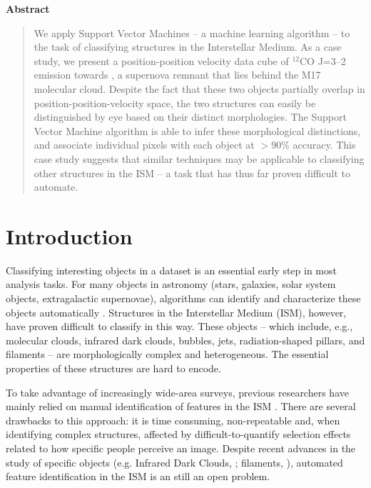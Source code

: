 
\begin{center}
  \bfseries Abstract
\end{center}
\begin{quote}
We apply Support Vector Machines -- a machine learning algorithm --  to the task of classifying structures in the Interstellar Medium. As a case study, we present a position-position velocity data cube of $^{12}$CO J=3--2 emission towards \snr{}, a supernova remnant that lies behind the M17 molecular cloud. Despite the fact that these two objects partially overlap in position-position-velocity space, the two structures can easily be distinguished by eye based on their distinct morphologies. The Support Vector Machine algorithm is able to infer these morphological distinctions, and associate individual pixels with each object at $>$90\% accuracy. This case study suggests that similar techniques may be applicable to classifying other structures in the ISM -- a task that has thus far proven difficult to automate.
\end{quote}

\section{Introduction}
\label{sec:intro}

Classifying interesting objects in a dataset is an essential early step in most analysis tasks. For many objects in astronomy (stars, galaxies, solar system objects, extragalactic supernovae), algorithms can identify and characterize these objects automatically \citep{Irwin85, Bertin96, Naylor98}. Structures in the Interstellar Medium (ISM), however, have proven difficult to classify in this way. These objects -- which include, e.g., molecular clouds, infrared dark clouds, bubbles, jets, radiation-shaped pillars, and filaments -- are morphologically complex and heterogeneous. The essential properties of these structures are hard to encode.

To take advantage of increasingly wide-area surveys, previous researchers have mainly relied on manual identification of features in the ISM \citep{Churchwell06, Helfand06, Curtis10, Arce10}. There are several drawbacks to this approach: it is time consuming, non-repeatable and, when identifying complex structures, affected by difficult-to-quantify selection effects related to how specific people perceive an image. Despite recent advances in the study of specific objects (e.g. Infrared Dark Clouds, \citealt{Peretto09};  filaments, \citealt{Menshchikov10}), automated feature identification in the ISM is an still an open problem.

